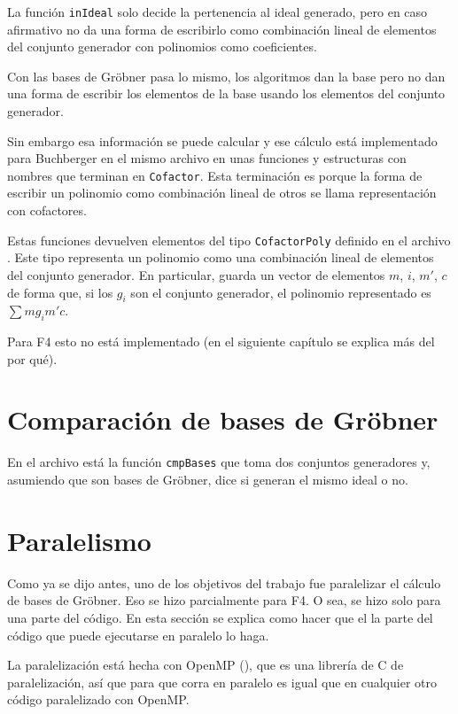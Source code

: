 \documentclass[12pt]{report}
\theoremstyle{customstyle}
\theoremstyle{factstyle}
\newcommand\cpp{C\nolinebreak[4]\hspace{-.05em}\raisebox{.4ex}{\relsize{-3}{\textbf{++}}}\xspace}
\begin{document}
La función \texttt{inIdeal} solo decide la pertenencia al ideal generado, pero en caso afirmativo no da una forma de escribirlo como combinación lineal de elementos del conjunto generador con polinomios como coeficientes.

Con las bases de Gröbner pasa lo mismo, los algoritmos dan la base pero no dan una forma de escribir los elementos de la base usando los elementos del conjunto generador.

Sin embargo esa información se puede calcular y ese cálculo está implementado para Buchberger en el mismo archivo  en unas funciones y estructuras con nombres que terminan en \texttt{Cofactor}. Esta terminación es porque la forma de escribir un polinomio como combinación lineal de otros se llama representación con cofactores.

Estas funciones devuelven elementos del tipo \texttt{CofactorPoly} definido en el archivo . Este tipo representa un polinomio como una combinación lineal de elementos del conjunto generador. En particular, guarda un vector de elementos $m$, $i$, $m'$, $c$ de forma que, si los $g_i$ son el conjunto generador, el polinomio representado es $∑ m g_i m' c$.

Para F4 esto no está implementado (en el siguiente capítulo se explica más del por qué).


\section{Comparación de bases de Gröbner}\label{section:Comparación de bases de Gröbner (libreria)}

En el archivo  está la función \texttt{cmpBases} que toma dos conjuntos generadores y, asumiendo que son bases de Gröbner, dice si generan el mismo ideal o no.

\section{Paralelismo} %

Como ya se dijo antes, uno de los objetivos del trabajo fue paralelizar el cálculo de bases de Gröbner. Eso se hizo parcialmente para F4. O sea, se hizo solo para una parte del código. En esta sección se explica como hacer que el la parte del código que puede ejecutarse en paralelo lo haga.

La paralelización está hecha con OpenMP (\cite{lib:openmp}), que es una librería de \cpp de paralelización, así que para que corra en paralelo es igual que en cualquier otro código paralelizado con OpenMP.
\end{document}
